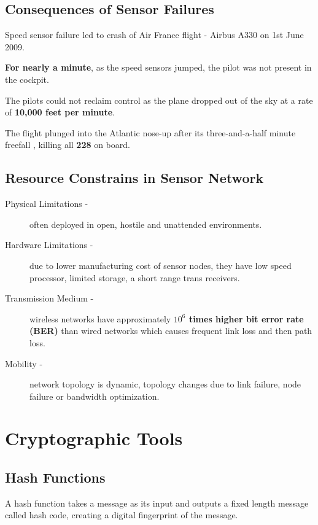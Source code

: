 \documentclass[%
  slidesonly,%
  semlayer%
  ]{seminar}                                  %
\begin{document}
\begin{slide}
  \subsection*{Consequences of Sensor Failures}
      \vfill
      Speed sensor failure led to crash of Air France flight - Airbus A330 on 1st June 2009.
      
      \textbf{For nearly a minute}, as the speed sensors jumped, the pilot was not present in the cockpit. 

      The pilots could not reclaim control as the plane dropped out of the sky at a rate of \textbf{10,000 feet per minute}.
          
      The flight plunged into the Atlantic nose-up after its three-and-a-half minute freefall , killing all \textbf{228} on board.      
      \vfill
      \clearpage

  \subsection*{Resource Constrains in Sensor Network}
    \vfill
    \begin{description}
      \item[Physical Limitations -] often deployed in open, hostile and unattended environments.

      \item[Hardware Limitations -] due to lower manufacturing cost of sensor nodes, they have low speed processor, limited storage, a short range trans receivers.

      \item[Transmission Medium -] wireless networks have approximately \textbf{$10^6$ times higher bit error rate (BER)} than wired networks which causes frequent link loss and then path loss.

      \item[Mobility -] network topology is dynamic, topology changes due to link failure, node failure or bandwidth optimization.
    \end{description}
    \vfill
    \clearpage

\section*{Cryptographic Tools}
  \vfill
  \subsection*{Hash Functions}
    A hash function takes a message as its input and outputs a fixed length message called hash code, creating a digital fingerprint of the message.


\end{slide}
\end{document}

